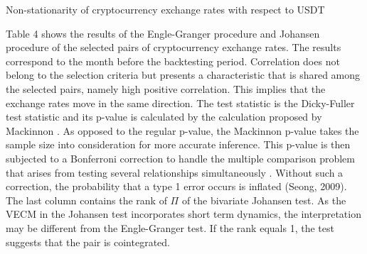 \documentclass[12pt,english,authoryear]{article}
\begin{document}
\begin{table}[h]
\centering
\caption{\label{tab:table-name} Non-stationarity of cryptocurrency exchange rates with respect to USDT}
\caption*{\footnotesize The cryptocurrency exchange rates in the sample are tested for a unit root by means of the ADF test. The null hypothesis states that the time series in question contains a unit root. The alternative hypothesis rejects the statement that the time series contains a unit root. The null hypothesis is rejected at a 5\% confidence level.}

\end{table} 

Table 4 shows the results of the Engle-Granger procedure and Johansen procedure of the selected pairs of cryptocurrency exchange rates. The results correspond to the month before the backtesting period. Correlation does not belong to the selection criteria but presents a characteristic that is shared among the selected pairs, namely high positive correlation. This implies that the exchange rates move in the same direction. The test statistic is the Dicky-Fuller test statistic and its p-value is calculated by the calculation proposed by Mackinnon \citeyear{Mackinnon_1991}. As opposed to the regular p-value, the Mackinnon p-value takes the sample size into consideration for more accurate inference. This p-value is then subjected to a Bonferroni correction to handle the multiple comparison problem that arises from testing several relationships simultaneously \cite{Bonferroni_1936}. Without such a correction, the probability that a type 1 error occurs is inflated (Seong, 2009). The last column contains the rank of $\Pi$ of the bivariate Johansen test. As the VECM in the Johansen test incorporates short term dynamics, the interpretation may be different from the Engle-Granger test. If the rank equals 1, the test suggests that the pair is cointegrated.
\end{document}
